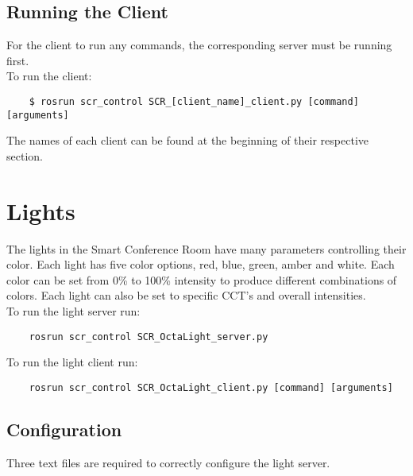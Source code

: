 \documentclass[twoside]{article}
\begin{document}
 	\subsection{Running the Client}
 	For the client to run any commands, the corresponding server must be running first.\\
 	To run the client:
 	
 	\begin{verbatim}
 	$ rosrun scr_control SCR_[client_name]_client.py [command] [arguments]
 	\end{verbatim}
 	The names of each client can be found at the beginning of their respective section.
 	

	\section{Lights}
	The lights in the Smart Conference Room have many parameters controlling their color. Each light has five color options, red, blue, green, amber and white. Each color can be set from 0\% to 100\% intensity to produce different combinations of colors. Each light can also be set to specific CCT's and overall intensities. \\
	
	To run the light server run:
	\begin{verbatim}
	rosrun scr_control SCR_OctaLight_server.py
	\end{verbatim}
	
	To run the light client run:
	\begin{verbatim}
	rosrun scr_control SCR_OctaLight_client.py [command] [arguments]
	\end{verbatim}	

	
	\subsection{Configuration}
	Three text files are required to correctly configure the light server.
	
\end{document}

